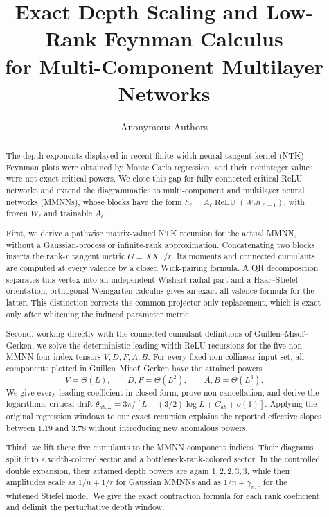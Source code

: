 \documentclass{article}
\title{Exact Depth Scaling and Low-Rank Feynman Calculus\\
for Multi-Component Multilayer Networks}
\author{Anonymous Authors}
\newcommand{\relu}{\operatorname{ReLU}}
\begin{document}
\maketitle

\begin{abstract}
The depth exponents displayed in recent finite-width neural-tangent-kernel
(NTK) Feynman plots were obtained by Monte Carlo regression, and their
noninteger values were not exact critical powers.  We close this gap for
fully connected critical ReLU networks and extend the diagrammatics to
multi-component and multilayer neural networks (MMNNs), whose blocks have the
form
\(h_\ell=A_\ell\relu(W_\ell h_{\ell-1})\), with frozen \(W_\ell\) and
trainable \(A_\ell\).

First, we derive a pathwise matrix-valued NTK recursion for the actual MMNN,
without a Gaussian-process or infinite-rank approximation.  Concatenating
two blocks inserts the rank-\(r\) tangent metric
\(G=XX^\top/r\).  Its moments and connected cumulants are computed at every
valence by a closed Wick-pairing formula.  A QR decomposition separates this
vertex into an independent Wishart radial part and a Haar--Stiefel
orientation; orthogonal Weingarten calculus gives an exact all-valence
formula for the latter.  This distinction corrects the common projector-only
replacement, which is exact only after whitening the induced parameter
metric.

Second, working directly with the connected-cumulant definitions of
Guillen--Misof--Gerken, we solve the deterministic leading-width ReLU
recursions for the five non-MMNN four-index tensors \(V,D,F,A,B\).  For every fixed non-collinear input set,
all components plotted in Guillen--Misof--Gerken have the attained powers
\[
V=\Theta(L),\qquad D,F=\Theta(L^2),\qquad A,B=\Theta(L^3).
\]
We give every leading coefficient in closed form, prove non-cancellation,
and derive the logarithmic critical drift
\(\theta_{ab,L}=3\pi/[L+(3/2)\log L+C_{ab}+o(1)]\).
Applying the original regression windows to our exact recursion explains the
reported effective slopes between \(1.19\) and \(3.78\) without introducing
new anomalous powers.

Third, we lift these five cumulants to the MMNN component indices.  Their
diagrams split into a width-colored sector and a bottleneck-rank-colored
sector.  In the controlled double expansion, their attained depth powers are
again \(1,2,2,3,3\), while their amplitudes scale as \(1/n+1/r\) for Gaussian
MMNNs and as \(1/n+\gamma_{n,r}\) for the whitened Stiefel model.  We give the
exact contraction formula for each rank coefficient and delimit the
perturbative depth window.


\end{abstract}
\end{document}
